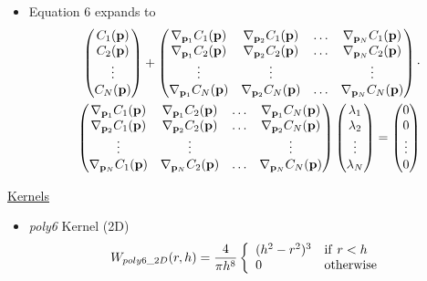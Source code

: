 \documentclass[10pt]{article}
\begin{document}
\begin{itemize}
    \item Equation 6 expands to
        \begin{eqnarray*}
            \begin{pmatrix}
                C_1({\bf p}) \\
                C_2({\bf p}) \\
                \vdots \\
                C_N({\bf p})
            \end{pmatrix}
            +
            \begin{pmatrix}
                \nabla_{{\bf p}_1} C_1({\bf p}) &  \nabla_{{\bf p}_2} C_1({\bf p}) & \hdots  & \nabla_{{\bf p}_N} C_1({\bf p}) \\
                \nabla_{{\bf p}_1} C_2({\bf p}) &  \nabla_{{\bf p}_2} C_2({\bf p}) & \hdots  & \nabla_{{\bf p}_N} C_2({\bf p}) \\
                \vdots & \vdots & & \vdots \\
                \nabla_{{\bf p}_1} C_N({\bf p})  &  \nabla_{{\bf p}_2} C_N({\bf p}) & \hdots  & \nabla_{{\bf p}_N} C_N({\bf p}) \\
            \end{pmatrix} \cdot \\
            {\vspace{6cm}}
            \begin{pmatrix}
                \nabla_{{\bf p}_1} C_1({\bf p}) &  \nabla_{{\bf p}_1} C_2({\bf p}) & \hdots  & \nabla_{{\bf p}_1} C_N({\bf p}) \\
                \nabla_{{\bf p}_2} C_1({\bf p}) &  \nabla_{{\bf p}_2} C_2({\bf p}) & \hdots  & \nabla_{{\bf p}_2} C_N({\bf p}) \\
                \vdots & \vdots & & \vdots \\
                \nabla_{{\bf p}_N} C_1({\bf p})  &  \nabla_{{\bf p}_N} C_2({\bf p}) & \hdots  & \nabla_{{\bf p}_N} C_N({\bf p}) \\
            \end{pmatrix}
            \begin{pmatrix}
                \lambda_1 \\
                \lambda_2 \\
                \vdots \\
                \lambda_N
            \end{pmatrix}
            =
            \begin{pmatrix}
                0 \\
                0 \\
                \vdots \\
                0
            \end{pmatrix}          
        \end{eqnarray*}
\end{itemize}

\underline{Kernels}
\begin{itemize}
    \item \emph{poly6} Kernel (2D)
        \begin{eqnarray}
        W_{poly6\_2D}(r, h) = \frac{4}{\pi h^8}\left\{\begin{array}{ll} (h^2 - r^2)^3 & {\rm if\ } r < h \\ 0 & {\rm otherwise}\end{array}\right.
        \end{eqnarray}
\end{itemize}
\end{document}
